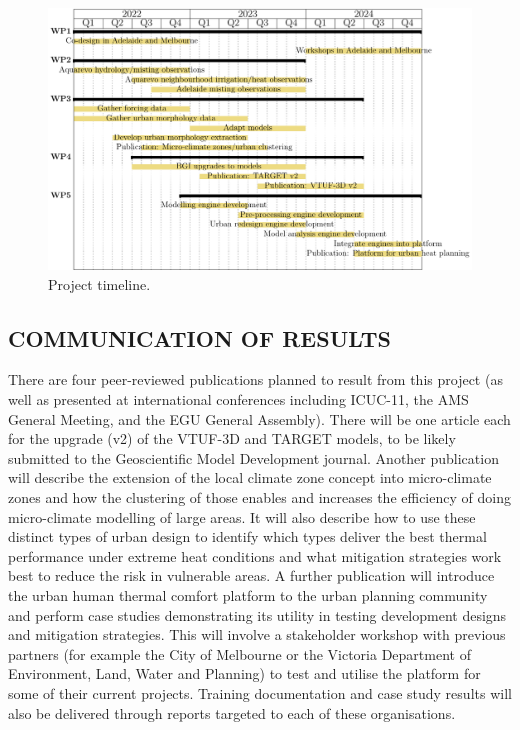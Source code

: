 \begin{figure}[ht]
\centering
\includegraphics[scale=0.70]{DECRA-D-timeline.pdf}
\caption{Project timeline. }
\label{fig:timeline}
\end{figure}


\subsection*{\TitleFont COMMUNICATION OF RESULTS}


There are four peer-reviewed publications planned to result from this project (as well as presented at international conferences including ICUC-11, the AMS General Meeting, and the EGU General Assembly). There will be one article each for the upgrade (v2) of the VTUF-3D and TARGET models, to be likely submitted to the Geoscientific Model Development journal. Another publication will describe the extension of the local climate zone concept into micro-climate zones and how the clustering of those enables and increases the efficiency of doing micro-climate modelling of large areas. It will also describe how to use these distinct types of urban design to identify which types deliver the best thermal performance under extreme heat conditions and what mitigation strategies work best to reduce the risk in vulnerable areas. A further publication will introduce the urban human thermal comfort platform to the urban planning community and perform case studies demonstrating its utility in testing development designs and mitigation strategies. This will involve a stakeholder workshop with previous partners (for example the City of Melbourne or the Victoria Department of Environment, Land, Water and Planning) to test and utilise the platform for some of their current projects. Training documentation and case study results will also be delivered through reports targeted to each of these organisations. 


